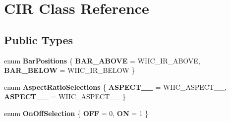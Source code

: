 \hypertarget{class_c_i_r}{\section{C\-I\-R Class Reference}
\label{class_c_i_r}
}
\subsection*{Public Types}
\begin{DoxyCompactItemize}
\item 
enum {\bfseries Bar\-Positions} \{ {\bfseries B\-A\-R\-\_\-\-A\-B\-O\-V\-E} =  W\-I\-I\-C\-\_\-\-I\-R\-\_\-\-A\-B\-O\-V\-E, 
{\bfseries B\-A\-R\-\_\-\-B\-E\-L\-O\-W} =  W\-I\-I\-C\-\_\-\-I\-R\-\_\-\-B\-E\-L\-O\-W
 \}
\item 
enum {\bfseries Aspect\-Ratio\-Selections} \{ {\bfseries A\-S\-P\-E\-C\-T\-\_\-\_} =  W\-I\-I\-C\-\_\-\-A\-S\-P\-E\-C\-T\-\_\-\_, 
{\bfseries A\-S\-P\-E\-C\-T\-\_\-\_} =  W\-I\-I\-C\-\_\-\-A\-S\-P\-E\-C\-T\-\_\-\_
 \}
\item 
enum {\bfseries On\-Off\-Selection} \{ {\bfseries O\-F\-F} =  0, 
{\bfseries O\-N} =  1
 \}
\end{DoxyCompactItemize}
